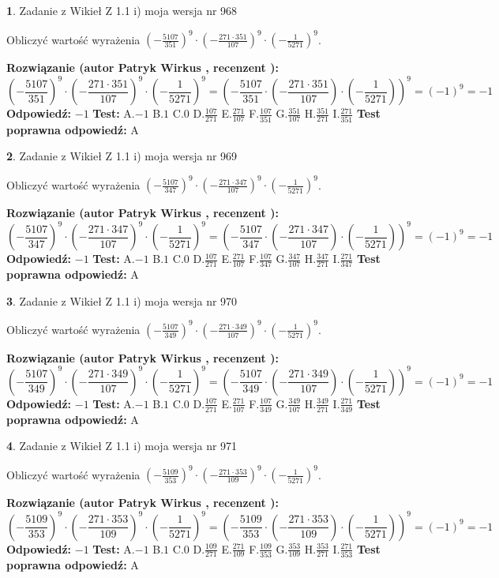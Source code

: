 \documentclass[12pt, a4paper]{article}
\theoremstyle{definition} %
\newtheorem{zad}{}
\newcommand{\zadStart}[1]{\begin{zad}#1\newline}
\newcommand{\zadStop}{\end{zad}}
\newcommand{\rozwStart}[2]{\noindent \textbf{Rozwiązanie (autor #1 , recenzent #2): }\newline}
\newcommand{\rozwStop}{\newline}
\newcommand{\odpStart}{\noindent \textbf{Odpowiedź:}\newline}
\newcommand{\odpStop}{\newline}
\newcommand{\testStart}{\noindent \textbf{Test:}\newline}
\newcommand{\testStop}{\newline}
\newcommand{\kluczStart}{\noindent \textbf{Test poprawna odpowiedź:}\newline}
\newcommand{\kluczStop}{\newline}
\begin{document}
\zadStart{Zadanie z Wikieł Z 1.1 i) moja wersja nr 968}

Obliczyć wartość wyrażenia $(-\frac{5107}{351})^{9} \cdot (-\frac{271 \cdot 351}{107})^{9} \cdot (-\frac{1}{5271})^{9}$.
\zadStop
\rozwStart{Patryk Wirkus}{}
$$(-\frac{5107}{351})^{9} \cdot (-\frac{271 \cdot 351}{107})^{9} \cdot (-\frac{1}{5271})^{9} = (-\frac{5107}{351} \cdot (-\frac{271 \cdot 351}{107}) \cdot (-\frac{1}{5271}))^{9} = (-1)^{9} = -1$$
\rozwStop
\odpStart
$-1$
\odpStop
\testStart
A.$-1$ B.$1$ C.$0$ D.$\frac{107}{271}$ E.$\frac{271}{107}$
F.$\frac{107}{351}$ G.$\frac{351}{107}$
H.$\frac{351}{271}$
I.$\frac{271}{351}$
\testStop
\kluczStart
A
\kluczStop



\zadStart{Zadanie z Wikieł Z 1.1 i) moja wersja nr 969}

Obliczyć wartość wyrażenia $(-\frac{5107}{347})^{9} \cdot (-\frac{271 \cdot 347}{107})^{9} \cdot (-\frac{1}{5271})^{9}$.
\zadStop
\rozwStart{Patryk Wirkus}{}
$$(-\frac{5107}{347})^{9} \cdot (-\frac{271 \cdot 347}{107})^{9} \cdot (-\frac{1}{5271})^{9} = (-\frac{5107}{347} \cdot (-\frac{271 \cdot 347}{107}) \cdot (-\frac{1}{5271}))^{9} = (-1)^{9} = -1$$
\rozwStop
\odpStart
$-1$
\odpStop
\testStart
A.$-1$ B.$1$ C.$0$ D.$\frac{107}{271}$ E.$\frac{271}{107}$
F.$\frac{107}{347}$ G.$\frac{347}{107}$
H.$\frac{347}{271}$
I.$\frac{271}{347}$
\testStop
\kluczStart
A
\kluczStop



\zadStart{Zadanie z Wikieł Z 1.1 i) moja wersja nr 970}

Obliczyć wartość wyrażenia $(-\frac{5107}{349})^{9} \cdot (-\frac{271 \cdot 349}{107})^{9} \cdot (-\frac{1}{5271})^{9}$.
\zadStop
\rozwStart{Patryk Wirkus}{}
$$(-\frac{5107}{349})^{9} \cdot (-\frac{271 \cdot 349}{107})^{9} \cdot (-\frac{1}{5271})^{9} = (-\frac{5107}{349} \cdot (-\frac{271 \cdot 349}{107}) \cdot (-\frac{1}{5271}))^{9} = (-1)^{9} = -1$$
\rozwStop
\odpStart
$-1$
\odpStop
\testStart
A.$-1$ B.$1$ C.$0$ D.$\frac{107}{271}$ E.$\frac{271}{107}$
F.$\frac{107}{349}$ G.$\frac{349}{107}$
H.$\frac{349}{271}$
I.$\frac{271}{349}$
\testStop
\kluczStart
A
\kluczStop



\zadStart{Zadanie z Wikieł Z 1.1 i) moja wersja nr 971}

Obliczyć wartość wyrażenia $(-\frac{5109}{353})^{9} \cdot (-\frac{271 \cdot 353}{109})^{9} \cdot (-\frac{1}{5271})^{9}$.
\zadStop
\rozwStart{Patryk Wirkus}{}
$$(-\frac{5109}{353})^{9} \cdot (-\frac{271 \cdot 353}{109})^{9} \cdot (-\frac{1}{5271})^{9} = (-\frac{5109}{353} \cdot (-\frac{271 \cdot 353}{109}) \cdot (-\frac{1}{5271}))^{9} = (-1)^{9} = -1$$
\rozwStop
\odpStart
$-1$
\odpStop
\testStart
A.$-1$ B.$1$ C.$0$ D.$\frac{109}{271}$ E.$\frac{271}{109}$
F.$\frac{109}{353}$ G.$\frac{353}{109}$
H.$\frac{353}{271}$
I.$\frac{271}{353}$
\testStop
\kluczStart
A
\kluczStop
\end{document}
